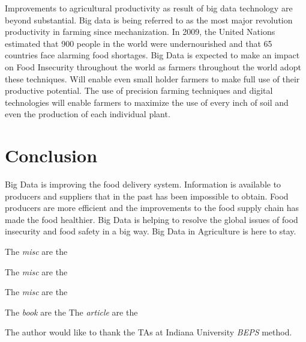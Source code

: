 \documentclass[sigconf]{acmart}
\begin{document}
Improvements to agricultural productivity as result of big data technology are beyond substantial. Big data is being referred to as the most major revolution productivity in farming since mechanization.  In 2009, the United Nations estimated that 900 people in the world were undernourished and that 65 countries face alarming food shortages. Big Data is expected to make an impact on Food Insecurity throughout the world as farmers throughout the world adopt these techniques. Will enable even small holder farmers to make full use of their productive potential. The use of precision farming techniques and digital technologies will enable farmers to maximize the use of every inch of soil and even the production of each individual plant.

\section{Conclusion}
Big Data is improving the food delivery system. Information is available to producers and suppliers that in the past has been impossible to obtain. Food producers are more efficient and the improvements to the food supply chain has made the food healthier. Big Data is helping to resolve the global issues of food insecurity and food safety in a big way. Big Data in Agriculture is here to stay. 

 \cite{vanGundy09}
The \textit{misc} are the \cite{www-google}

The \textit{misc} are the \cite{www-google1}

The \textit{misc} are the \cite{www-google2}

The \textit{book} are the \cite{book}
The \textit{article} are the \cite{article1}
\begin{acks}

  The author would like to thank the TAs at Indiana University \textit{BEPS} method.

\end{acks}


 
\end{document}
